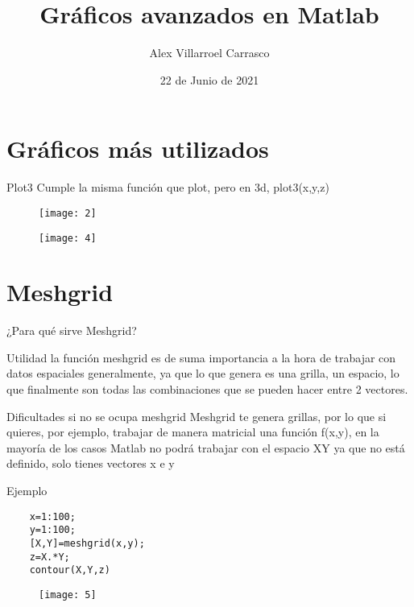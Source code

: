 \documentclass[11pt]{beamer}
\begin{document}
	\author{Alex Villarroel Carrasco}
	\title{Gráficos avanzados en Matlab}
	\date{22 de Junio de 2021}
	\begin{frame}[plain]
		\maketitle
	\end{frame}
	\tableofcontents
	\section{Gráficos más utilizados}
	\begin{frame}{Plot3}
		Cumple la misma función que plot, pero en 3d, plot3(x,y,z)\begin{figure}
			\centering
			\texttt{[image: 2]}
			\label{fig:2}
		\end{figure}
		
	\end{frame}
\begin{frame}{}
\begin{figure}
	\centering
	\texttt{[image: 4]}
	\label{fig:4}
\end{figure}
\end{frame}
	\section{Meshgrid}
	\begin{frame}{¿Para qué sirve Meshgrid?}
		\begin{block}{Utilidad}
			la función meshgrid es de suma importancia a la hora de trabajar con datos espaciales generalmente, ya que lo que genera es una grilla, un espacio, lo que finalmente son todas las combinaciones que se pueden hacer entre 2 vectores.
		\end{block}
	\begin{exampleblock}{Dificultades si no se ocupa meshgrid}
		Meshgrid te genera grillas, por lo que si quieres, por ejemplo, trabajar de manera matricial una función f(x,y), en la mayoría de los casos Matlab no podrá trabajar con el espacio XY ya que no está definido, solo tienes vectores x e y
	\end{exampleblock}
	\end{frame}
\begin{frame}[fragile]{Ejemplo}
	\begin{verbatim}
	x=1:100;
	y=1:100;
	[X,Y]=meshgrid(x,y);
	z=X.*Y;
	contour(X,Y,z)
	\end{verbatim}
\begin{figure}
	\centering
	\texttt{[image: 5]}

	\label{fig:5}
\end{figure}

\end{frame}
\end{document}
